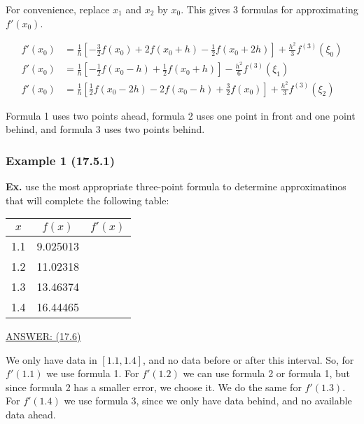 \documentclass[12pt]{article}
\newcommand{\Ex}{\textbf{Ex.}\xspace}
\begin{document}
For convenience, replace $x_1$ and $x_2$ by $x_0$. This gives 3 formulas for
approximating $f'(x_0)$.

\begin{align*}
    f'(x_0) &= \frac{1}{h} \left[ -\frac{3}{2} f(x_0) + 2 f(x_0 + h) - \frac{1}{2} f(x_0 + 2h) \right] 
    + \frac{h^2}{3} f^{(3)}(\xi_0) \\[10pt]
    f'(x_0) &= \frac{1}{h} \left[ -\frac{1}{2} f(x_0 - h) + \frac{1}{2} f(x_0 + h) \right] 
    - \frac{h^2}{6} f^{(3)}(\xi_1) \\[10pt]
    f'(x_0) &= \frac{1}{h} \left[ \frac{1}{2} f(x_0 - 2h) - 2 f(x_0 - h) + \frac{3}{2} f(x_0) \right] 
    + \frac{h^2}{3} f^{(3)}(\xi_2)
\end{align*}

Formula 1 uses two points ahead, formula 2 uses one point in front and one point
behind, and formula 3 uses two points behind.

\pagebreak
\subsubsection{Example 1 (17.5.1)}\label{sec:example_1}

\Ex use the most appropriate three-point formula to determine approximatinos
that will complete the following table:

\begin{table}[h]
    \centering
    \begin{tabular}{|c|c|c|}
        \hline
        $x$  & $f(x)$    & $f'(x)$ \\ 
        \hline
        1.1  & 9.025013  &  \\ 
        1.2  & 11.02318  &  \\ 
        1.3  & 13.46374  &  \\ 
        1.4  & 16.44465  &  \\ 
        \hline
    \end{tabular}
\end{table}

\uline{ANSWER: (17.6)}

We only have data in $[1.1, 1.4]$, and no data before or after this interval.
So, for $f'(1.1)$ we use formula 1. For $f'(1.2)$ we can use formula 2 or
formula 1, but since formula 2 has a smaller error, we choose it. We do the same
for $f'(1.3)$. For $f'(1.4)$ we use formula 3, since we only have data behind,
and no available data ahead.
\end{document}
